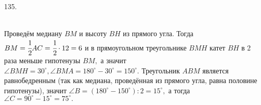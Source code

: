 135. \begin{figure}[ht!]
\end{figure}\\
Проведём медиану $BM$ и высоту $BH$ из прямого угла. Тогда $BM=\cfrac{1}{2}AC=\cfrac{1}{2}\cdot12=6$ и в прямоугольном треугольнике $BMH$ катет $BH$ в 2 раза меньше гипотенузы $BM,$ а значит $\angle BMH=30^\circ, \angle BMA=180^\circ-30^\circ=150^\circ.$ Треугольник $ABM$ является равнобедренным (так как медиана, проведённая из прямого угла, равна половине гипотенузы), значит $\angle B=(180^\circ-150^\circ):2=15^\circ,$ а тогда $\angle C=90^\circ-15^\circ=75^\circ.$\\
